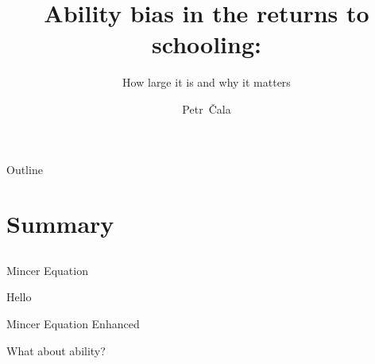 \documentclass{beamer} %
\title[Ability bias and education] %
{Ability bias in the returns to schooling:}
\subtitle{How large it is and why it matters}
\author {Petr~\v{C}ala}
\institute[CUNI]
{
  Institute of Economic Studies\\
  Charles University, Prague\\
 
  \vspace{1.5em}

  \pgfdeclareimage[height=1.5cm]{logo}{Figures/logo.pdf} %
  \pgfuseimage{logo}

}
\date[June 19, 2024]
\begin{document}
\begin{frame}
  \titlepage
\end{frame}


\begin{frame}{Outline}
  \tableofcontents
\end{frame}


\section{Summary}
\subsection{}







\begin{frame}{Mincer Equation}
  \begin{center}

    \begin{Large}
      Hello
    \end{Large}


  \end{center}
\end{frame}

\begin{frame}{Mincer Equation Enhanced}
  \begin{center}

    \begin{Large}
      What about ability?
    \end{Large}


  \end{center}
\end{frame}
\end{document}
